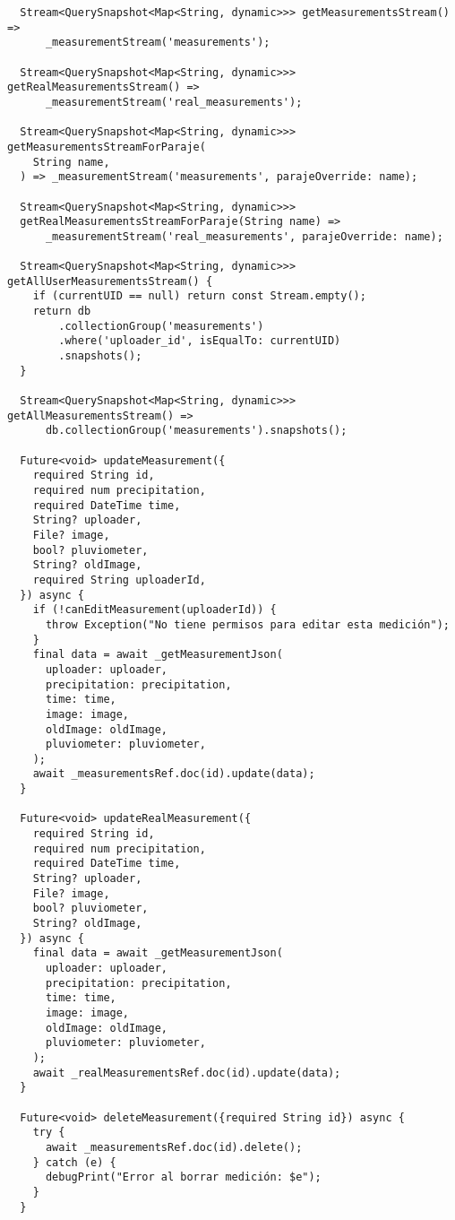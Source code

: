 \begin{verbatim}
  Stream<QuerySnapshot<Map<String, dynamic>>> getMeasurementsStream() =>
      _measurementStream('measurements');

  Stream<QuerySnapshot<Map<String, dynamic>>> getRealMeasurementsStream() =>
      _measurementStream('real_measurements');

  Stream<QuerySnapshot<Map<String, dynamic>>> getMeasurementsStreamForParaje(
    String name,
  ) => _measurementStream('measurements', parajeOverride: name);

  Stream<QuerySnapshot<Map<String, dynamic>>>
  getRealMeasurementsStreamForParaje(String name) =>
      _measurementStream('real_measurements', parajeOverride: name);

  Stream<QuerySnapshot<Map<String, dynamic>>> getAllUserMeasurementsStream() {
    if (currentUID == null) return const Stream.empty();
    return db
        .collectionGroup('measurements')
        .where('uploader_id', isEqualTo: currentUID)
        .snapshots();
  }

  Stream<QuerySnapshot<Map<String, dynamic>>> getAllMeasurementsStream() =>
      db.collectionGroup('measurements').snapshots();

  Future<void> updateMeasurement({
    required String id,
    required num precipitation,
    required DateTime time,
    String? uploader,
    File? image,
    bool? pluviometer,
    String? oldImage,
    required String uploaderId,
  }) async {
    if (!canEditMeasurement(uploaderId)) {
      throw Exception("No tiene permisos para editar esta medición");
    }
    final data = await _getMeasurementJson(
      uploader: uploader,
      precipitation: precipitation,
      time: time,
      image: image,
      oldImage: oldImage,
      pluviometer: pluviometer,
    );
    await _measurementsRef.doc(id).update(data);
  }

  Future<void> updateRealMeasurement({
    required String id,
    required num precipitation,
    required DateTime time,
    String? uploader,
    File? image,
    bool? pluviometer,
    String? oldImage,
  }) async {
    final data = await _getMeasurementJson(
      uploader: uploader,
      precipitation: precipitation,
      time: time,
      image: image,
      oldImage: oldImage,
      pluviometer: pluviometer,
    );
    await _realMeasurementsRef.doc(id).update(data);
  }

  Future<void> deleteMeasurement({required String id}) async {
    try {
      await _measurementsRef.doc(id).delete(); 
    } catch (e) {
      debugPrint("Error al borrar medición: $e");
    }
  }


\end{verbatim}

